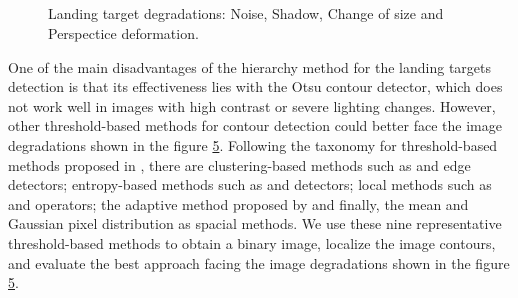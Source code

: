   
\begin{figure}[!ht]
    \centering
    \begin{subfigure}[b]{0.3\textwidth}
        \caption{}
        \label{fig:deg_noise}
    \end{subfigure}
        ~ %
    \begin{subfigure}[b]{0.3\textwidth}
        \caption{}
        \label{fig:deg_shadow}
    \end{subfigure}\\
        ~ %
    \begin{subfigure}[b]{0.3\textwidth}
        \caption{}
        \label{fig:deg_resolution}
    \end{subfigure}
        ~ %
    \begin{subfigure}[b]{0.3\textwidth}
        \caption{}
        \label{fig:deg_deformation}
    \end{subfigure}
    \caption{ Landing target degradations:  Noise,  Shadow,  Change of size and  Perspectice deformation.}\label{fig:tar_degradations}
\end{figure}


One of the main disadvantages of the hierarchy method for the landing targets detection is that its effectiveness lies with the Otsu contour detector, which does not work well in images with high contrast or severe lighting changes. However, other threshold-based methods for contour detection could better face the image degradations shown in the figure \ref{fig:tar_degradations}. Following the taxonomy for threshold-based methods proposed in \citep{Sezgin.Sankur:EI:2010}, there are clustering-based methods such as \cite{Otsu:SMC:1979} and \cite{Ridler.Calvard:TSMC:1978} edge detectors; entropy-based methods such as \cite{Yen.Chang.ea:TIP:1995} and \cite{Li.Lee:ICPR:1993} detectors; local methods such as \cite{Niblack:ImageProcc:1986} and \cite{Sauvola.Pietikainen:ICPR:2000} operators; the adaptive method proposed by \cite{Bradley.Roth:ACM:2007} and finally, the mean and Gaussian pixel distribution as spacial methods. We use these nine representative threshold-based methods to obtain a binary image, localize the image contours, and evaluate the best approach facing the image degradations shown in the figure \ref{fig:tar_degradations}.


